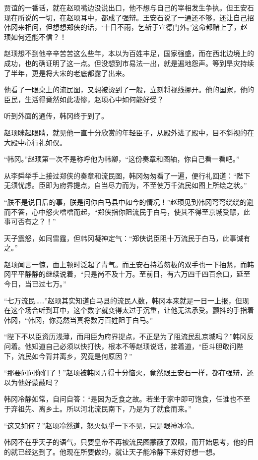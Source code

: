 贾谊的一番话，就在赵顼嘴边没说出口，他不想与自己的宰相发生争执。但王安石现在所说的一切，在赵顼耳中，都成了强辩。王安石说了一通还不够，还让自己招韩冈来相问，但想想郑侠的话，‘十日不雨，乞斩于宣德门外。’这命都赌上了，赵顼如何还能不信？！

赵顼想不到他辛辛苦苦这么些年，本以为百姓丰足，国家强盛，而在西北边境上的成功，也的确证明了这一点。但没想到市易法一出，就是遍地怨声。等到旱灾持续了半年，更是将大宋的老底都露了出来。

他看了一眼桌上的流民图，又想被烫到了一般，立刻将视线挪开。他的国家，他的臣民，生活得竟然如此凄惨，赵顼心中如何能好受？

听到外面的通传，韩冈终于到了。

赵顼眯起眼睛，就见他一直十分欣赏的年轻臣子，从殿外进了殿中，目不斜视的在大殿中心行礼如仪。

“韩冈。”赵顼第一次不是称呼他为韩卿，“这份奏章和图轴，你自己看一看吧。”

从李舜举手上接过郑侠的奏章和流民图，韩冈匆匆看了一遍，便行礼回道：“陛下无须忧虑。臣即为府界提点，自当尽力而为，不至使万千流民如图上所绘之状。”

“朕不是说日后的事，朕是问你白马县中如今的情况！”赵顼见到韩冈弯弯绕绕的避而不答，心中怒火噌噌而起，“郑侠指你阻流民于白马，使其不得至京城受赈，此事可否有之？！”

天子震怒，如同雷霆，但韩冈凝神定气：“郑侠说臣阻十万流民于白马，此事诚有之。”

赵顼闻言一惊，面上顿时泛起了青气。而王安石持着笏板的双手也一下抽紧，而韩冈平平静静的继续说着，“只是尚不及十万。至前日，有六万四千四百余口，延至今日，当已过七万。”

“七万流民……”赵顼其实知道白马县的流民人数，韩冈本来就是一日一上报，但现在这个场合听到耳中，这个数字就变得太过于沉重，让他无法承受。颤抖的手指着韩冈，“韩冈，你竟然当真将数万百姓阻于白马。”

“陛下不以臣资历浅薄，而用臣为府界提点，不正是为了阻流民乱京城吗？”韩冈反问着。他知道自己必须以快打快，根本不等赵顼说话，接着道，“臣斗胆敢问陛下，流民如今背井离乡，究竟是何原因？”

“那要问问你们了！”赵顼被韩冈弄得十分恼火，竟然跟王安石一样，都在强辩，还以为他好蒙蔽吗？

韩冈冷静如常，自问自答：“是因为乏食之故。若坐于家中即可饱食，任谁也不至于弃祖先、离乡土。所以河北流民南下，乃是为了就食而来。”

“这又如何？”赵顼冷然道，怒火似乎一下不见，只是眼神冰冷。

韩冈不在乎天子的语气，只要皇帝不再被流民图蒙蔽了双眼，而开始思考，他的目的就已经达到了。他现在所要做的，就让天子能冷静下来好好想一想。

